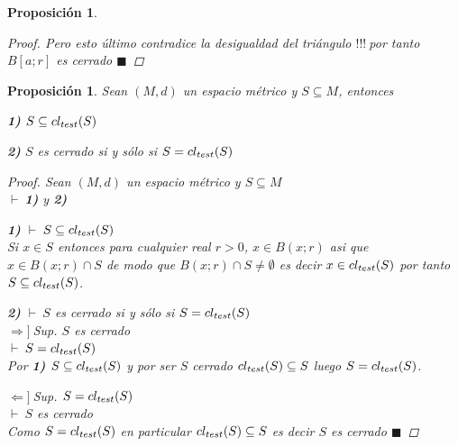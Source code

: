 \documentclass[oneside]{book} %
\theoremstyle{Teorema}
\newtheorem{Proposicion}[Definicion]{Proposición}
\theoremstyle{Ejemplos}
\theoremstyle{[Obs]}
\def \test {test}
\newcommand{\cerradura}[2][\test]{\ifx \test #1 {\overline{#2}} \else {cl_{#1}(#2)} \fi} %
\renewcommand{\{}{\left\lbrace} %
\renewcommand{\}}{\right\rbrace} %
\newcommand{\n}{\cap} %
\renewcommand{\sc}{\subseteq} %
\renewcommand{\qed}{$\blacksquare$} %
\newcommand{\pd}{$\vdash\ $} %
\renewcommand{\c}{$!!!\ $} %
\newcommand{\necesidad}{$\Rightarrow]\ $} %
\newcommand{\suficiencia}{$\Leftarrow]\ $} %
\begin{document}
\begin{Proposicion}
\begin{proof}
					Pero esto último contradice la desigualdad del triángulo \c por tanto $B[a;r]$ es cerrado \qed

				\end{proof}

			\end{Proposicion}

			\begin{Proposicion}\setlength{\parindent}{0em}
			
				Sean $(M, d)$ un espacio métrico y $S \sc M$, entonces 

				\textbf{1)} $S \sc \cerradura{S}$ 

				\textbf{2)} $S$ es cerrado si y sólo si $S = \cerradura{S}$

				\begin{proof}
					
					Sean $(M, d)$ un espacio métrico y $S \sc M$ \\ 
					\pd \textbf{1)} y \textbf{2)}

					\textbf{1)} \pd $S \sc \cerradura{S}$ \\ 
					Si $x \in S$ entonces para cualquier real $r > 0$, $x \in B(x;r)$ asi que $x \in B(x;r) \n S$ de modo que $B(x;r) \n S \neq \emptyset$ es decir $x \in \cerradura{S}$ por tanto $S \sc \cerradura{S}$.

					\textbf{2)} \pd $S$ es cerrado si y sólo si $S = \cerradura{S}$ \\ 
					\necesidad Sup. $S$ es cerrado \\ 
					\pd $S = \cerradura{S}$ \\ 
					Por \textbf{1)} $S \sc \cerradura{S}$ y por ser $S$ cerrado $\cerradura{S} \sc S$ luego $S = \cerradura{S}$.

					\suficiencia Sup. $S = \cerradura{S}$ \\ 
					\pd $S$ es cerrado \\ 
					Como $S = \cerradura{S}$ en particular $\cerradura{S} \sc S$ es decir $S$ es cerrado \qed

				\end{proof}
			
			\end{Proposicion}
\end{document}
